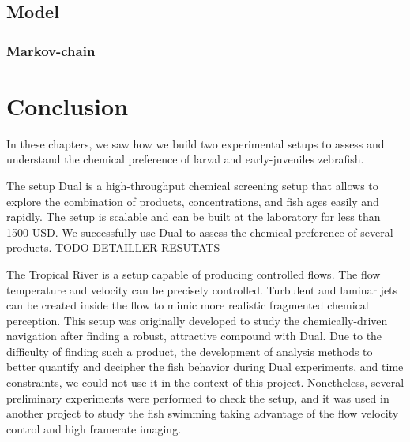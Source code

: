   \section{Model}
  \subsection{Markov-chain}

\chapter{Conclusion}

  In these chapters, we saw how we build two experimental setups to assess and understand the chemical preference of larval and early-juveniles zebrafish.


  The setup Dual is a high-throughput chemical screening setup that allows to explore the combination of products, concentrations, and fish ages easily and rapidly. The setup is scalable and can be built at  the laboratory for less than 1500 USD. We successfully use Dual to assess the chemical preference of several products. TODO DETAILLER RESUTATS


  The Tropical River is a setup capable of producing controlled flows. The flow temperature and velocity can be precisely controlled. Turbulent and laminar jets can be created inside the flow to mimic more realistic fragmented chemical perception. This setup was originally developed to study the chemically-driven navigation after finding a robust, attractive compound with Dual. Due to the difficulty of finding such a product, the development of analysis methods to better quantify and decipher the fish behavior during Dual experiments, and time constraints, we could not use it in the context of this project. Nonetheless, several preliminary experiments were performed to check the setup, and it was used in another project to study the fish swimming taking advantage of the flow velocity control and high framerate imaging.
